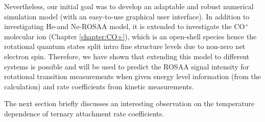 Nevertheless, our initial goal was to develop an adaptable and robust numerical
simulation model (with an easy-to-use graphical user interface). In addition to
investigating He-\CD and Ne-\CD ROSAA model, it is extended to investigate the
CO$^+$ molecular ion (Chapter \ref{chapter:CO+}), which is an open-shell
species hence the rotational quantum states split intro fine structure levels
due to non-zero net electron spin. Therefore, we have shown that extending this
model to different systems is possible and will be used to predict the ROSAA
signal intensity for rotational transition measurements when given energy level
information (from the calculation) and rate coefficients from kinetic
measurements.

The next section briefly discusses an interesting observation on the
temperature dependence of ternary attachment rate coefficients.

